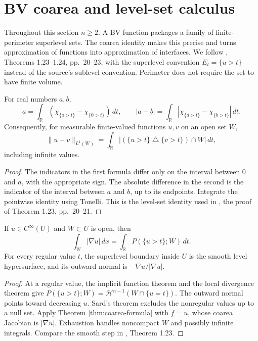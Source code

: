 \chapter{BV coarea and level-set calculus}\label{sec:bv-coarea}
Throughout this section $n\geq2$. A BV function packages a family of finite-perimeter superlevel sets. The coarea identity makes this precise and turns approximation of functions into approximation of interfaces. We follow \cite{Giu84}, Theorems 1.23--1.24, pp.~20--23, with the superlevel convention $E_t=\{u>t\}$ instead of the source's sublevel convention. Perimeter does not require the set to have finite volume.

\begin{lemma}\label{lem:level-set-layer-cake}
For real numbers $a,b$,
\[
 a=\int_{\mathbb R}(\chi_{\{a>t\}}-\chi_{\{0>t\}})\,dt,
 \qquad |a-b|=\int_{\mathbb R}|\chi_{\{a>t\}}-\chi_{\{b>t\}}|\,dt.
\]
Consequently, for measurable finite-valued functions $u,v$ on an open set $W$,
\[
 \|u-v\|_{L^1(W)}
 =\int_{\mathbb R}|(\{u>t\}\mathbin{\triangle}\{v>t\})\cap W|\,dt,
\]
including infinite values.
\end{lemma}
\begin{proof}
The indicators in the first formula differ only on the interval between $0$ and $a$, with the appropriate sign. The absolute difference in the second is the indicator of the interval between $a$ and $b$, up to its endpoints. Integrate the pointwise identity using Tonelli. This is the level-set identity used in \cite{Giu84}, the proof of Theorem 1.23, pp.~20--21.
\end{proof}

\begin{proposition}\label{prop:smooth-superlevel-coarea}
If $u\in C^\infty(U)$ and $W\subset U$ is open, then
\[
 \int_W|\nabla u|\,dx=\int_{\mathbb R}P(\{u>t\};W)\,dt.
\]
For every regular value $t$, the superlevel boundary inside $U$ is the smooth level hypersurface, and its outward normal is $-\nabla u/|\nabla u|$.
\end{proposition}
\begin{proof}
At a regular value, the implicit function theorem and the local divergence theorem give
$P(\{u>t\};W)=\mathcal H^{n-1}(W\cap\{u=t\})$. The outward normal points toward decreasing $u$. Sard's theorem excludes the nonregular values up to a null set. Apply Theorem \ref{thm:coarea-formula} with $f=u$, whose coarea Jacobian is $|\nabla u|$. Exhaustion handles noncompact $W$ and possibly infinite integrals. Compare the smooth step in \cite{Giu84}, Theorem 1.23.
\end{proof}

